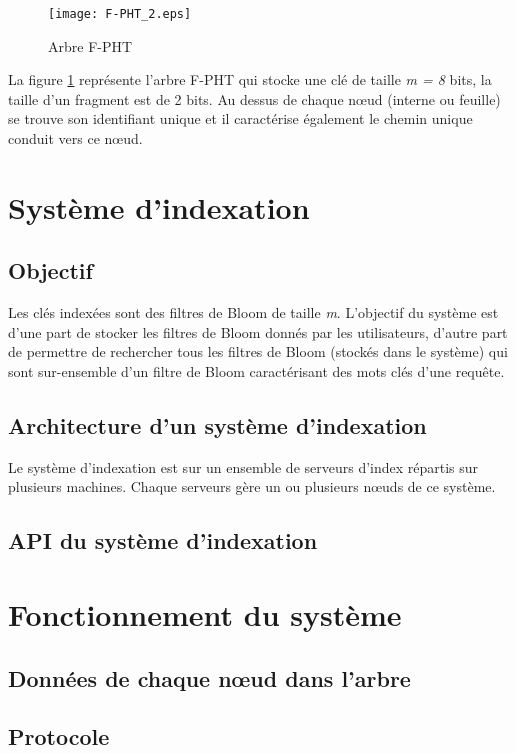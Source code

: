 \documentclass[a4paper,11pt]{report}
\begin{document}
	\begin{figure}[!htbp]
	\centering
	\texttt{[image: F-PHT\_2.eps]}
	\caption{Arbre F-PHT}
	\label{F-PHT2}
	\end{figure}	
	
	La figure \ref{F-PHT2} représente l'arbre F-PHT qui stocke une clé de taille \textit{m = 8} bits, la taille d'un fragment est de 2 bits. Au dessus de chaque nœud (interne ou feuille) se trouve son identifiant unique et il caractérise également le chemin unique conduit vers ce nœud.
	
\chapter{Système d'indexation}
\section{Objectif}
	Les clés indexées sont des filtres de Bloom de taille \textit{m}.
	L'objectif du système est d'une part de stocker les filtres de Bloom donnés par les utilisateurs, d'autre part de permettre de rechercher tous les filtres de Bloom (stockés dans le système) qui sont sur-ensemble d'un filtre de Bloom caractérisant des mots clés d'une requête.

\section{Architecture d'un système d'indexation}
	Le système d'indexation est sur un ensemble de serveurs d'index répartis sur plusieurs machines. Chaque serveurs gère un ou plusieurs nœuds de ce système.

\section{API du système d'indexation}
	
	
\chapter{Fonctionnement du système}
\section{Données de chaque nœud dans l'arbre}
\section{Protocole}
\end{document}

